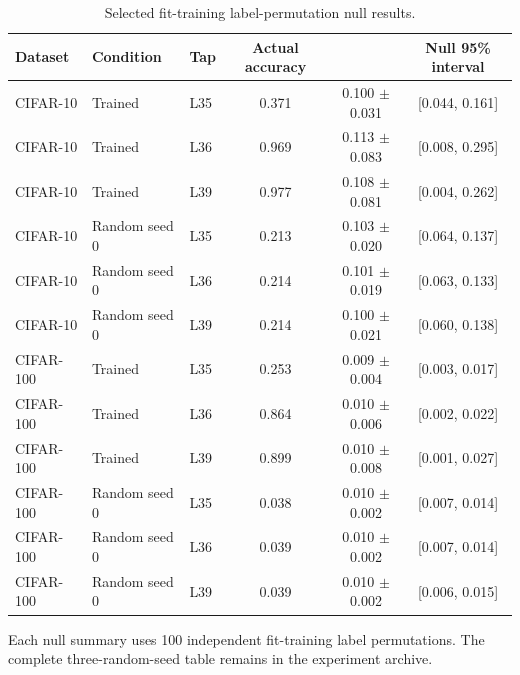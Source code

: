 \begin{table}[!htbp]
\centering
\begin{threeparttable}
\caption{Selected fit-training label-permutation null results.}
\label{tab:pca-label-permutation-null}
\fontsize{8}{9.8}\selectfont
\setlength{\tabcolsep}{3.2pt}
\renewcommand{\arraystretch}{1.05}
\begin{tabularx}{\linewidth}{@{}l Y l c c c@{}}
\toprule
Dataset & Condition & Tap & {Actual accuracy} & {} & {Null 95\% interval}\\
\midrule
CIFAR-10 & Trained & L35 & 0.371 & 0.100 $\pm$ 0.031 & [0.044, 0.161]\\
\thinrowrule
CIFAR-10 & Trained & L36 & 0.969 & 0.113 $\pm$ 0.083 & [0.008, 0.295]\\
\thinrowrule
CIFAR-10 & Trained & L39 & 0.977 & 0.108 $\pm$ 0.081 & [0.004, 0.262]\\
\midrule
CIFAR-10 & Random seed 0 & L35 & 0.213 & 0.103 $\pm$ 0.020 & [0.064, 0.137]\\
\thinrowrule
CIFAR-10 & Random seed 0 & L36 & 0.214 & 0.101 $\pm$ 0.019 & [0.063, 0.133]\\
\thinrowrule
CIFAR-10 & Random seed 0 & L39 & 0.214 & 0.100 $\pm$ 0.021 & [0.060, 0.138]\\
\midrule
CIFAR-100 & Trained & L35 & 0.253 & 0.009 $\pm$ 0.004 & [0.003, 0.017]\\
\thinrowrule
CIFAR-100 & Trained & L36 & 0.864 & 0.010 $\pm$ 0.006 & [0.002, 0.022]\\
\thinrowrule
CIFAR-100 & Trained & L39 & 0.899 & 0.010 $\pm$ 0.008 & [0.001, 0.027]\\
\midrule
CIFAR-100 & Random seed 0 & L35 & 0.038 & 0.010 $\pm$ 0.002 & [0.007, 0.014]\\
\thinrowrule
CIFAR-100 & Random seed 0 & L36 & 0.039 & 0.010 $\pm$ 0.002 & [0.007, 0.014]\\
\thinrowrule
CIFAR-100 & Random seed 0 & L39 & 0.039 & 0.010 $\pm$ 0.002 & [0.006, 0.015]\\
\bottomrule
\end{tabularx}
\begin{tablenotes}[flushleft]\fontsize{8}{9.6}\selectfont
\item Each null summary uses 100 independent fit-training label permutations. The complete three-random-seed table remains in the experiment archive.
\end{tablenotes}
\end{threeparttable}
\end{table}
